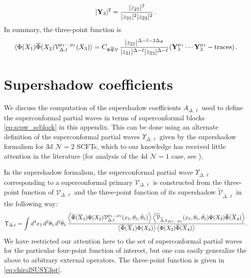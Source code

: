 \documentclass[11pt]{article}
\newcommand{\thetab}{\bar{\theta}}
\begin{document}
\begin{equation}
|{\bf Y}_3|^2 =\frac {|z_{2 1}|^2}{ |z_{ 3 1}|^2 |z_{ 2 3}|^2}\,.
\end{equation}
%
In summary, the three-point function is
%
\begin{equation}\label{eq:chiralSUSY3pt}
\langle \Phi(X_1) \overline \Phi(X_2)  {\cal V}_{\Delta,\ell}^{\mu_1\cdots \mu_\ell}(X_3)\rangle = C_{\Phi\overline\Phi {\cal V}} \, \frac{|z_{ 2 1}|^{\Delta-\ell-2\Delta_\Phi} }{ |z_{ 3 1}|^{\Delta-\ell}  |z_{ 23}|^{\Delta-\ell} }({\bf Y}_3^{\mu_1}\cdots{\bf Y}_3^{\mu_\ell}-{\rm traces})\,.
\end{equation}
%



\section{Supershadow coefficients}
\label{sec:ssops}

We discuss the computation of the supershadow coefficients $A_{\Delta,\ell}$ used to define the superconformal partial waves in terms of superconformal blocks \eqref{eq:scpw_scblock} in this appendix. This can be done using an alternate definition of the superconformal partial waves $\Upsilon_{\Delta,\ell}$ given by the supershadow formalism for 3d $\mathcal{N}=2$ SCFTs, which to our knowledge has received little attention in the literature (for analysis of the 4d $\mathcal{N}=1$ case, see \cite{Fitzpatrick:2014oza, Khandker:2014mpa}).

In the supershadow formalism, the superconformal partial wave $\Upsilon_{\Delta,\ell}$ corresponding to a superconformal primary $\mathcal{V}_{\Delta,\ell}$ is constructed from the three-point function of $\mathcal{V}_{\Delta,\ell}$ and the three-point function of its supershadow $\widetilde{\mathcal{V}}_{\widetilde{\Delta},\ell}$ in the following way:
%
\begin{equation}\label{eq:scpw_ssform}
\Upsilon_{\Delta,\ell} = \int d^{3}x_{5}\,d^{2}\theta_{5}\,d^{2}\thetab_{5}\,\frac{\expval{ \overline{\Phi}(\overline{X}_{1})\Phi(X_{2})\mathcal{V}_{\Delta,\ell}^{\mu_{1}\ldots\mu_{\ell}}(x_{5},\theta_{5},\thetab_{5})}\expval{ \widetilde{\mathcal{V}}_{\widetilde{\Delta},\ell;\mu_{1}\ldots\mu_{\ell}}(x_{5},\theta_{5},\thetab_{5})\Phi(X_{3})\overline{\Phi}(\overline{X}_{4})}}{\expval{\overline{\Phi}(\overline{X}_{1})\Phi(X_{2})}\expval{\Phi(X_{3})\overline{\Phi}(\overline{X}_{4})}}.
\end{equation}
%
We have restricted our attention here to the set of superconformal partial waves for the particular four-point function of interest, but one can easily generalize the above to arbitrary external operators. The three-point function is given in \eqref{eq:chiralSUSY3pt}.
\end{document}
